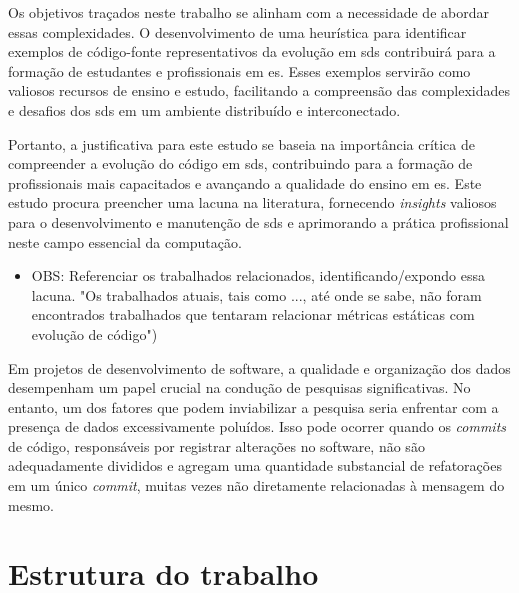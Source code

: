 Os objetivos traçados neste trabalho se alinham com a necessidade de abordar essas complexidades. O desenvolvimento de uma heurística para identificar exemplos de código-fonte representativos da evolução em \gls{sds} contribuirá para a formação de estudantes e profissionais em \gls{es}. Esses exemplos servirão como valiosos recursos de ensino e estudo, facilitando a compreensão das complexidades e desafios dos \gls{sds} em um ambiente distribuído e interconectado.

Portanto, a justificativa para este estudo se baseia na importância crítica de compreender a evolução do código em \gls{sds}, contribuindo para a formação de profissionais mais capacitados e avançando a qualidade do ensino em \gls{es}. Este estudo procura preencher uma lacuna na literatura, fornecendo \textit{insights} valiosos para o desenvolvimento e manutenção de \gls{sds} e aprimorando a prática profissional neste campo essencial da computação.

\begin{itemize}
    \item OBS: Referenciar os trabalhados relacionados, identificando/expondo essa lacuna. "Os trabalhados atuais, tais como ..., até onde se sabe, não foram encontrados trabalhados que tentaram relacionar métricas estáticas com evolução de código")
\end{itemize}

Em projetos de desenvolvimento de software, a qualidade e organização dos dados desempenham um papel crucial na condução de pesquisas significativas. No entanto, um dos fatores que podem inviabilizar a pesquisa seria enfrentar com a presença de dados excessivamente poluídos. Isso pode ocorrer quando os \textit{commits} de código, responsáveis por registrar alterações no software, não são adequadamente divididos e agregam uma quantidade substancial de refatorações em um único \textit{commit}, muitas vezes não diretamente relacionadas à mensagem do mesmo.


\section{Estrutura do trabalho}
\label{sec:estruturaTrabalho}
